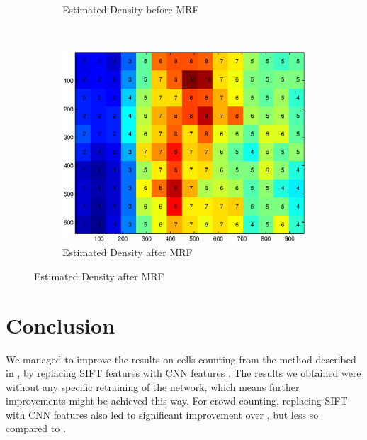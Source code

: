 \documentclass[a4paper,11pt, french]{article}
\begin{document}
\begin{figure}[h!]
\begin{subfigure}[b]{0.3\textwidth}
          \caption{Estimated Density before MRF}
        \end{subfigure}
        ~
        \begin{subfigure}[b]{0.3\textwidth}
	  \includegraphics[width=\textwidth]{figures/mrf_after.eps}
          \caption{Estimated Density after MRF}
        \end{subfigure}
\end{figure}

\section*{Conclusion}
We managed to improve the results on cells counting from the method described in \cite{basepaper}, by replacing SIFT features with CNN features \cite{overfeat}. The results we obtained were without any specific retraining of the network, which means further improvements might be achieved this way. For crowd counting, replacing SIFT with CNN features also led to significant improvement over \cite{basepaper}, but less so compared to \cite{multisource}.


\end{document}
